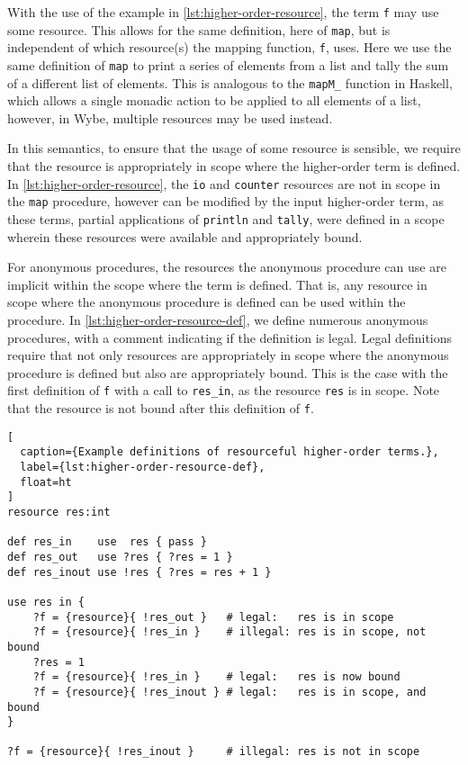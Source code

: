 With the use of the example in \cref{lst:higher-order-resource}, the term \texttt{f} may use some resource. This allows for the same definition, here of \texttt{map}, but is independent of which resource(s) the mapping function, \texttt{f}, uses. Here we use the same definition of \texttt{map} to print a series of elements from a list and tally the sum of a different list of elements. This is analogous to the \texttt{mapM\_} function in Haskell, which allows a single monadic action to be applied to all elements of a list, however, in Wybe, multiple resources may be used instead.

In this semantics, to ensure that the usage of some resource is sensible, we require that the resource is appropriately in scope where the higher-order term is defined. In \cref{lst:higher-order-resource}, the \texttt{io} and \texttt{counter} resources are not in scope in the \texttt{map} procedure, however can be modified by the input higher-order term, as these terms, partial applications of \texttt{println} and \texttt{tally}, were defined in a scope wherein these resources were available and appropriately bound. 

For anonymous procedures, the resources the anonymous procedure can use are implicit within the scope where the term is defined. That is, any resource in scope where the anonymous procedure is defined can be used within the procedure. In \cref{lst:higher-order-resource-def}, we define numerous anonymous procedures, with a comment indicating if the definition is legal. Legal definitions require that not only resources are appropriately in scope where the anonymous procedure is defined but also are appropriately bound. This is the case with the first definition of \texttt{f} with a call to \texttt{res\_in}, as the resource \texttt{res} is in scope. Note that the resource is not bound after this definition of \texttt{f}.

\begin{lstlisting}[
  caption={Example definitions of resourceful higher-order terms.},
  label={lst:higher-order-resource-def},
  float=ht
]
resource res:int

def res_in    use  res { pass }
def res_out   use ?res { ?res = 1 }
def res_inout use !res { ?res = res + 1 }

use res in {
    ?f = {resource}{ !res_out }   # legal:   res is in scope
    ?f = {resource}{ !res_in }    # illegal: res is in scope, not bound
    ?res = 1
    ?f = {resource}{ !res_in }    # legal:   res is now bound
    ?f = {resource}{ !res_inout } # legal:   res is in scope, and bound
}

?f = {resource}{ !res_inout }     # illegal: res is not in scope
\end{lstlisting}

